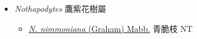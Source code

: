 
  \begin{itemize}
 \item[] \textit{Nothapodytes} 鷹紫花樹屬
                                
  \begin{itemize}
        \item[] \href{http://www.theplantlist.org/tpl1.1/search?q=Nothapodytes+nimmoniana}{\textit{N. nimmoniana} (Graham) Mabb.}   青脆枝   NT
  \end{itemize}
  \end{itemize}
